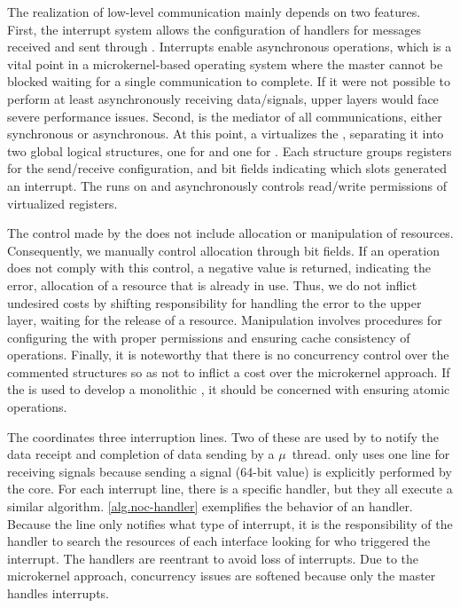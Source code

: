 			The realization of low-level communication mainly depends on two \mppa features.
			First, the interrupt system allows the configuration of handlers for messages
			received and sent through \noc. Interrupts enable asynchronous operations,
			which is a vital point in a microkernel-based operating system where the
			master cannot be blocked waiting for a single communication to complete.
			If it were not possible to perform at least asynchronously receiving
			data/signals, upper layers would face severe performance issues. Second,
			\dma is the mediator of all communications, either synchronous or asynchronous.
			At this point, a \hypervisor virtualizes the \dma, separating it into two global
			logical structures, one for \cnoc and one for \dnoc. Each structure groups
			registers for the send/receive configuration, and bit fields indicating which
			slots generated an interrupt. The \hypervisor runs on \rms and asynchronously
			controls read/write permissions of virtualized registers.

			The control made by the \hypervisor does not include allocation or manipulation
			of resources. Consequently, we manually control allocation through bit fields.
			If an operation does not comply with this control, a negative value is returned,
			indicating the error, \eg allocation of a resource that is already in use.
			Thus, we do not inflict undesired costs by shifting responsibility for handling
			the error to the upper layer, \eg waiting for the release of a resource.
			Manipulation involves procedures for configuring the \dma with proper
			permissions and ensuring cache consistency of operations. Finally, it is
			noteworthy that there is no concurrency control over the commented
			structures so as not to inflict a cost over the microkernel approach.
			If the \nanvix \hal is used to develop a monolithic \os, it should be
			concerned with ensuring atomic operations.

			The \dma coordinates three interruption lines. Two of these are used by
			\dnoc to notify the data receipt and completion of data sending by a
			$\mu$~thread. \cnoc only uses one line for receiving signals because
			sending a signal (64-bit value) is explicitly performed by the core.
			For each interrupt line, there is a specific handler, but they all
			execute a similar algorithm. \autoref{alg.noc-handler} exemplifies
			the behavior of an \noc handler. Because the line only notifies what
			type of interrupt, it is the responsibility of the handler to search
			the resources of each interface looking for who triggered the interrupt.
			The handlers are reentrant to avoid loss of interrupts. Due to the
			microkernel approach, concurrency issues are softened because only
			the master handles interrupts.

